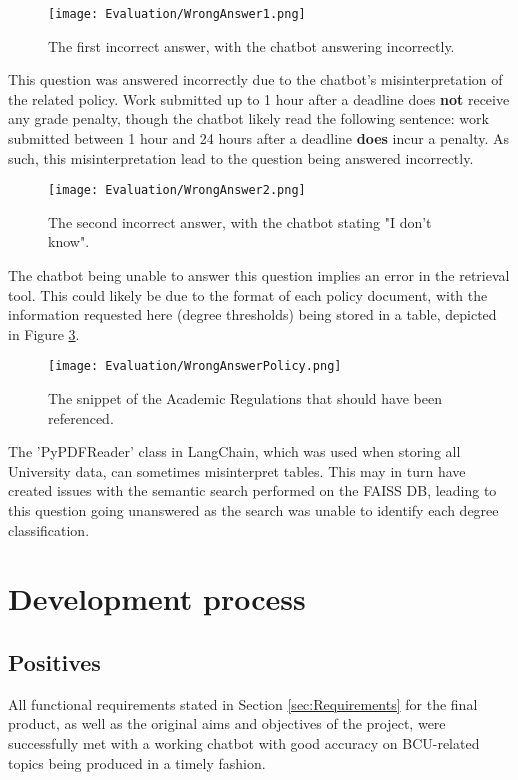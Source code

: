 \begin{figure}[H]
    \centering
    \texttt{[image: Evaluation/WrongAnswer1.png]}
    \caption{The first incorrect answer, with the chatbot answering incorrectly. \label{fig:WrongAnswer1}}
\end{figure}

\noindent This question was answered incorrectly due to the chatbot's misinterpretation of the related policy. Work submitted up to 
1 hour after a deadline does \textbf{not} receive any grade penalty, though the chatbot likely read the following sentence: work submitted between 1 hour and 
24 hours after a deadline \textbf{does} incur a penalty. As such, this misinterpretation lead to the question being answered incorrectly.

\begin{figure}[H]
    \centering
    \texttt{[image: Evaluation/WrongAnswer2.png]}
    \caption{The second incorrect answer, with the chatbot stating "I don't know". \label{fig:WrongAnswer2}}
\end{figure}

\noindent The chatbot being unable to answer this question implies an error in the retrieval tool. This could likely be due to the 
format of each policy document, with the information requested here (degree thresholds) being stored in a table, depicted in Figure 
\ref{fig:WrongAnswer2Snippet}.

\begin{figure}[H]
    \centering
    \texttt{[image: Evaluation/WrongAnswerPolicy.png]}
    \caption{The snippet of the Academic Regulations that should have been referenced. \autocite{bcuPoliciesProcedures} \label{fig:WrongAnswer2Snippet}}
\end{figure}

\noindent The 'PyPDFReader' class in LangChain, which was used when storing all University data, can sometimes misinterpret tables. 
This may in turn have created issues with the semantic search performed on the FAISS DB, leading to this question going unanswered as 
the search was unable to identify each degree classification.



\section{Development process}\label{sec:EvalProcess}
\subsection{Positives}
All functional requirements stated in Section \ref{sec:Requirements} for the final product, as well as the original aims and objectives 
of the project, were successfully met with a working chatbot with good accuracy on BCU-related topics being produced in a timely fashion.

